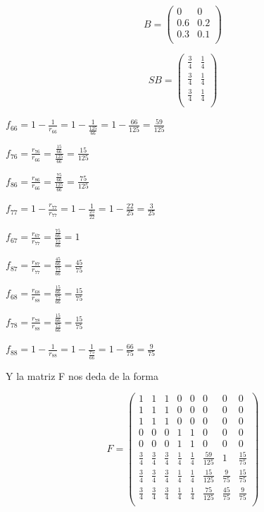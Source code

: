 \[
B =
\left(
\begin{array}{cc}
0 & 0 \\
0.6 & 0.2 \\
0.3 & 0.1 \\
\end{array}
\right)
\]

\[
SB =
\left(
\begin{array}{cc}
\frac{3}{4} & \frac{1}{4} \\
\frac{3}{4} & \frac{1}{4} \\
\frac{3}{4} & \frac{1}{4} \\
\end{array}
\right)
\]

$f_{66} = 1 - \frac{1}{r_{66}} = 1 - \frac{1}{\frac{125}{66}} = 1 - \frac{66}{125} = \frac{59}{125}$

$f_{76} = \frac{r_{76}}{r_{66}} = \frac{\frac{15}{66}}{\frac{125}{66}} = \frac{15}{125}$

$f_{86} = \frac{r_{86}}{r_{66}} = \frac{\frac{75}{66}}{\frac{125}{66}} = \frac{75}{125}$

$f_{77} = 1 - \frac{r_{77}}{r_{77}} = 1 - \frac{1}{\frac{25}{22}} = 1 - \frac{22}{25} = \frac{3}{25}$

$f_{67} = \frac{r_{67}}{r_{77}} = \frac{\frac{75}{66}}{\frac{75}{66}} = 1$

$f_{87} = \frac{r_{87}}{r_{77}} = \frac{\frac{45}{66}}{\frac{75}{66}} = \frac{45}{75}$

$f_{68} = \frac{r_{68}}{r_{88}} = \frac{\frac{15}{66}}{\frac{75}{66}} = \frac{15}{75}$

$f_{78} = \frac{r_{78}}{r_{88}} = \frac{\frac{15}{66}}{\frac{75}{66}} = \frac{15}{75}$

$f_{88} = 1 - \frac{1}{r_{88}} = 1 - \frac{1}{\frac{75}{66}} = 1 - \frac{66}{75} = \frac{9}{75}$

Y la matriz F nos deda de la forma

\[
F =
\left(
\begin{array}{cccccccc}
1 & 1 & 1 & 0 & 0 & 0 & 0 & 0 \\
1 & 1 & 1 & 0 & 0 & 0 & 0 & 0 \\
1 & 1 & 1 & 0 & 0 & 0 & 0 & 0 \\
0 & 0 & 0 & 1 & 1 & 0 & 0 & 0 \\
0 & 0 & 0 & 1 & 1 & 0 & 0 & 0 \\
\frac{3}{4} & \frac{3}{4} & \frac{3}{4} & \frac{1}{4} & \frac{1}{4} & \frac{59}{125} & 1 & \frac{15}{75} \\
\frac{3}{4} & \frac{3}{4} & \frac{3}{4} & \frac{1}{4} & \frac{1}{4} & \frac{15}{125} & \frac{9}{75} & \frac{15}{75} \\
\frac{3}{4} & \frac{3}{4} & \frac{3}{4} & \frac{1}{4} & \frac{1}{4} & \frac{75}{125} & \frac{45}{75} & \frac{9}{75} \\
\end{array}
\right)
\]

